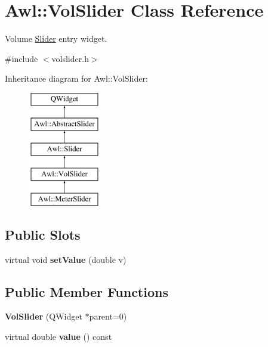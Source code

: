 \hypertarget{class_awl_1_1_vol_slider}{}\section{Awl\+:\+:Vol\+Slider Class Reference}
\label{class_awl_1_1_vol_slider}


Volume \hyperlink{class_awl_1_1_slider}{Slider} entry widget.  




{\ttfamily \#include $<$volslider.\+h$>$}

Inheritance diagram for Awl\+:\+:Vol\+Slider\+:\begin{figure}[H]
\begin{center}
\leavevmode
\includegraphics[height=5.000000cm]{class_awl_1_1_vol_slider}
\end{center}
\end{figure}
\subsection*{Public Slots}
\begin{DoxyCompactItemize}
\item 
\mbox{\label{class_awl_1_1_vol_slider_a3308a043ce66b0948574da8ea498bdc5}} 
virtual void {\bfseries set\+Value} (double v)
\end{DoxyCompactItemize}
\subsection*{Public Member Functions}
\begin{DoxyCompactItemize}
\item 
\mbox{\label{class_awl_1_1_vol_slider_af28928340879be685181d451f5b0d4d7}} 
{\bfseries Vol\+Slider} (Q\+Widget $\ast$parent=0)
\item 
\mbox{\label{class_awl_1_1_vol_slider_a9b1ebae4955be3aae83ee0692749615b}} 
virtual double {\bfseries value} () const
\end{DoxyCompactItemize}
